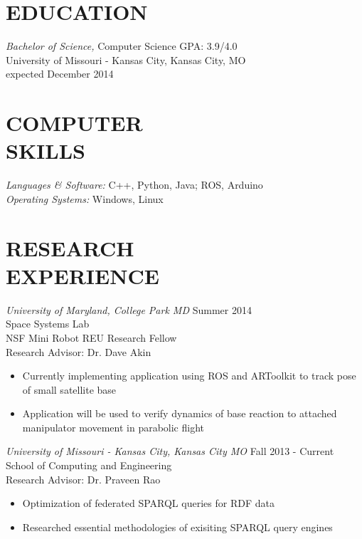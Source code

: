\documentclass[line,margin]{res}
\begin{document}
\address{\hfill (913)235-1070 \textbar \textbar \hspace{1 mm}  victoria.chen.wu@gmail.com \textbar \textbar \hspace{1 mm} github.com/vptarmigan} 

 
\begin{resume}
 
\section{EDUCATION} {\sl Bachelor of Science,} Computer Science	\hfill GPA: 3.9/4.0\\
                University of Missouri - Kansas City, Kansas City, MO \\
                expected December 2014 
\section{COMPUTER \\ SKILLS} {\sl Languages \& Software:} 
		C++, Python, Java; ROS, Arduino \\
                {\sl Operating Systems:} Windows, Linux 
\section {RESEARCH \\ EXPERIENCE}
	{\sl University of Maryland, College Park MD}  \hfill  Summer 2014\\
		Space Systems Lab\\
		NSF Mini Robot REU Research Fellow \\
		Research Advisor: Dr. Dave Akin 
                 \begin{itemize}[leftmargin=5mm]  \itemsep -2pt %
		 \item Currently implementing application using ROS and ARToolkit to track pose of small satellite base
		 \item Application will be used to verify dynamics of base reaction to attached manipulator movement in parabolic flight 
                 \end{itemize} 
	


		{\sl University of Missouri - Kansas City, Kansas City MO} \hfill Fall 2013 - Current \\
		School of Computing and Engineering \\
		Research Advisor: Dr. Praveen Rao
		 \begin{itemize} [leftmargin=5mm]  \itemsep -2pt %
		 \item  Optimization of federated SPARQL queries for RDF data
		\item   Researched essential methodologies of exisiting SPARQL query engines 
		\end{itemize}



\end{resume}
\end{document}
